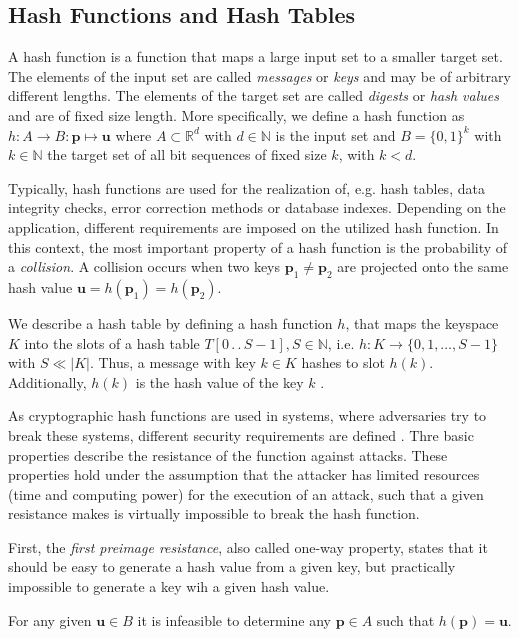 \subsection{Hash Functions and Hash Tables} \label{subsec:hash_functions_and_tables}
A hash function is a function that maps a large input set to a smaller target set. The elements of the input set are called \textit{messages} or \textit{keys} and may be of arbitrary different lengths. The elements of the target set are called \textit{digests} or \textit{hash values} and are of fixed size length. More specifically, we define a hash function as $h: A \rightarrow B : \bm{p} \mapsto \bm{u}$ where $A \subset \mathbb{R}^d$ with $d \in \mathbb{N}$ is the input set and $B=\{0, 1\}^k$ with $k \in \mathbb{N}$ the target set of all bit sequences of fixed size $k$, with $k < d$. 

Typically, hash functions are used for the realization of, e.g. hash tables, data integrity checks, error correction methods or database indexes. Depending on the application, different requirements are imposed on the utilized hash function. In this context, the most important property of a hash function is the probability of a \textit{collision}. A collision occurs when two keys $\bm{p}_1 \neq \bm{p}_2$ are projected onto the same hash value $\bm{u} = h(\bm{p}_1) = h(\bm{p}_2)$. 

We describe a hash table by defining a hash function $h$, that maps the keyspace $K$ into the slots of a hash table $T[0 \,.\,.\, S-1], S \in \mathbb{N}$, i.e. $h: K \rightarrow \{0, 1, \dots, S-1\}$ with $S \ll |K|$. Thus, a message with key $k \in K$ hashes to slot $h(k)$. Additionally, $h(k)$ is the hash value of the key $k$ \cite[256]{cormen2022introduction}.

As cryptographic hash functions are used in systems, where adversaries try to break these systems, different security requirements are defined \cite[349]{williamcryptography}. Thre basic properties describe the resistance of the function against attacks. These properties hold under the assumption that the attacker has limited resources (time and computing power) for the execution of an attack, such that a given resistance makes is virtually impossible to break the hash function.

First, the \textit{first preimage resistance}, also called one-way property, states that it should be easy to generate a hash value from a given key, but practically impossible to generate a key wih a given hash value.

\begin{definition}
    For any given $\bm{u} \in B$ it is infeasible to determine any $\bm{p} \in A$ such that $h(\bm{p})=\bm{u}$.
\end{definition}

